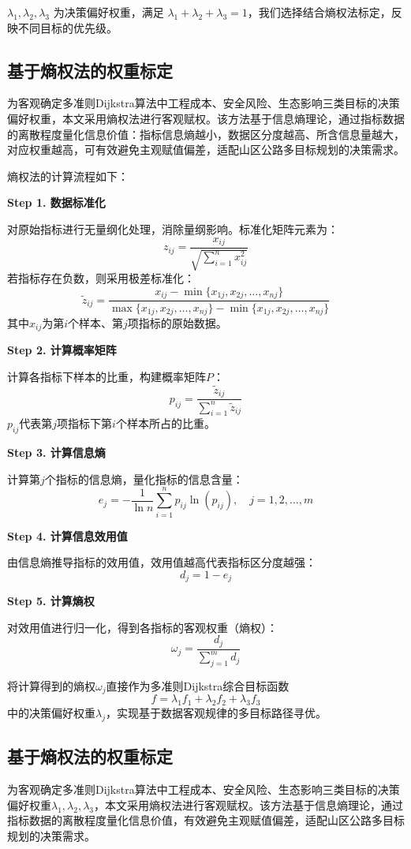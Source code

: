 \documentclass{article}
\begin{document}
	$\lambda_1,\lambda_2,\lambda_3$ 为决策偏好权重，满足 $\lambda_1+\lambda_2+\lambda_3=1$，我们选择结合熵权法标定，反映不同目标的优先级。
	
	\newpage
	
	
	\subsection{基于熵权法的权重标定}
	为客观确定多准则Dijkstra算法中工程成本、安全风险、生态影响三类目标的决策偏好权重，本文采用熵权法进行客观赋权。该方法基于信息熵理论，通过指标数据的离散程度量化信息价值：指标信息熵越小，数据区分度越高、所含信息量越大，对应权重越高，可有效避免主观赋值偏差，适配山区公路多目标规划的决策需求。
	
	熵权法的计算流程如下：
	
	\textbf{Step 1. 数据标准化}
	
	对原始指标进行无量纲化处理，消除量纲影响。标准化矩阵元素为：
	\[
	z_{ij} = \frac{x_{ij}}{\sqrt{\sum_{i=1}^n x_{ij}^2}}
	\]
	若指标存在负数，则采用极差标准化：
	\[
	\widetilde{z}_{ij} = \frac{x_{ij} - \min\{x_{1j},x_{2j},\dots,x_{nj}\}}{\max\{x_{1j},x_{2j},\dots,x_{nj}\} - \min\{x_{1j},x_{2j},\dots,x_{nj}\}}
	\]
	其中$x_{ij}$为第$i$个样本、第$j$项指标的原始数据。
	
	\textbf{Step 2. 计算概率矩阵}
	
	计算各指标下样本的比重，构建概率矩阵$P$：
	\[
	p_{ij} = \frac{\widetilde{z}_{ij}}{\sum_{i=1}^n \widetilde{z}_{ij}}
	\]
	$p_{ij}$代表第$j$项指标下第$i$个样本所占的比重。
	
	\textbf{Step 3. 计算信息熵}
	
	计算第$j$个指标的信息熵，量化指标的信息含量：
	\[
	e_j = -\frac{1}{\ln n}\sum_{i=1}^n p_{ij}\ln(p_{ij}),\quad j=1,2,\dots,m
	\]
	
	\textbf{Step 4. 计算信息效用值}
	
	由信息熵推导指标的效用值，效用值越高代表指标区分度越强：
	\[
	d_j = 1 - e_j
	\]
	
	\textbf{Step 5. 计算熵权}
	
	对效用值进行归一化，得到各指标的客观权重（熵权）：
	\[
	\omega_j = \frac{d_j}{\sum_{j=1}^m d_j}
	\]
	
	将计算得到的熵权$\omega_j$直接作为多准则Dijkstra综合目标函数
	\[
	f = \lambda_1 f_1 + \lambda_2 f_2 + \lambda_3 f_3
	\]
	中的决策偏好权重$\lambda_j$，实现基于数据客观规律的多目标路径寻优。
	
	\newpage
	
	\subsection{基于熵权法的权重标定}
	为客观确定多准则Dijkstra算法中工程成本、安全风险、生态影响三类目标的决策偏好权重$\lambda_1,\lambda_2,\lambda_3$，本文采用熵权法进行客观赋权。该方法基于信息熵理论，通过指标数据的离散程度量化信息价值，有效避免主观赋值偏差，适配山区公路多目标规划的决策需求。
	
\end{document}
